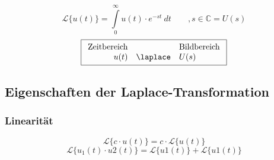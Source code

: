 \[ \boxed{\mathcal{L} \lbrace u(t) \rbrace 
= \int\limits_{0}^{\infty} u(t) \cdot e^{-st} ~ dt \qquad , s \in \mathbb{C} 
= U(s)} \]
\[ \boxed{\begin{array}{rcl}
\text{Zeitbereich} &  & \text{Bildbereich} \\
u(t) & \laplace & U(s)
\end{array}} \]


\subsection{Eigenschaften der Laplace-Transformation}

\subsubsection{Linearität}
\[ \boxed{\mathcal{L}\lbrace c \cdot u(t) \rbrace 
= c \cdot \mathcal{L}\lbrace u(t) \rbrace} \]
\[ \boxed{\mathcal{L}\lbrace u_1(t) \cdot u2(t) \rbrace 
= \mathcal{L}\lbrace u1(t) \rbrace + \mathcal{L}\lbrace u1(t) \rbrace} \]